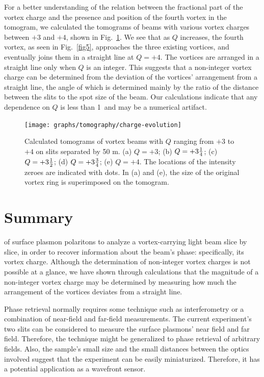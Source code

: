 For a better understanding of the relation between the fractional part of the vortex charge and the presence and position of the fourth vortex in the tomogram, we calculated the tomograms of beams with various vortex charges between $+3$ and $+4$, shown in Fig.~\ref{tomography:fig:fractional}.
We see that as $Q$ increases, the fourth vortex, as seen in Fig.~\ref{fig5}, approaches the three existing vortices, and eventually joins them in a straight line at $Q=+4$.
The vortices are arranged in a straight line only when $Q$ is an integer.
This suggests that a non-integer vortex charge can be determined from the deviation of the vortices' arrangement from a straight line, the angle of which is determined mainly by the ratio of the distance between the slits to the spot size of the beam.
Our calculations indicate that any dependence on $Q$ is less than 1\textdegree\ and may be a numerical artifact.
%
\begin{figure}[b]
\centering
\texttt{[image: graphs/tomography/charge-evolution]}
\caption{Calculated tomograms of vortex beams with $Q$ ranging from $+3$ to $+4$ on slits separated by 50 \textmu m.
(a) $Q=+3$; (b) $Q=+3\mbox{$\frac{1}{4}$}$; (c) $Q=+3\mbox{$\frac{1}{2}$}$; (d) $Q=+3\mbox{$\frac{3}{4}$}$; (e) $Q=+4$.
The locations of the intensity zeroes are indicated with dots.
In (a) and (e), the size of the original vortex ring is superimposed on the tomogram.}
\label{tomography:fig:fractional}
\end{figure}

\section{Summary}

 of surface plasmon polaritons to analyze a vortex-carrying light beam slice by slice, in order to recover information about the beam's phase: specifically, its vortex charge.
Although the determination of non-integer vortex charges is not possible at a glance, we have shown through calculations that the magnitude of a non-integer vortex charge may be determined by measuring how much the arrangement of the vortices deviates from a straight line.

Phase retrieval normally requires some technique such as interferometry or a combination of near-field and far-field measurements. The current experiment's two slits can be considered to measure the surface plasmons' near field and far field. Therefore, the technique might be generalized to phase retrieval of arbitrary fields.
Also, the sample's small size and the small distances between the optics involved suggest that the experiment can be easily miniaturized.
Therefore, it has a potential application as a wavefront sensor.
